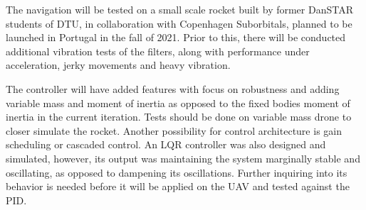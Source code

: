 The navigation will be tested on a small scale rocket built by former DanSTAR students of DTU, in collaboration with Copenhagen Suborbitals, planned to be launched in Portugal in the fall of 2021. Prior to this, there will be conducted additional vibration tests of the filters, along with performance under acceleration, jerky movements and heavy vibration. 

The controller will have added features with focus on robustness and adding variable mass and moment of inertia as opposed to the fixed bodies moment of inertia in the current iteration. Tests should be done on variable mass drone to closer simulate the rocket. 
Another possibility for control architecture is gain scheduling or cascaded control. 
An LQR controller was also designed and simulated, however, its output was maintaining the system marginally stable and oscillating, as opposed to dampening its oscillations. Further inquiring into its behavior is needed before it will be applied on the UAV and tested against the PID.  
